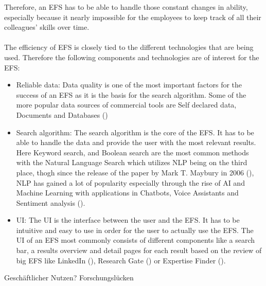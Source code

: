 Therefore, an \ac{EFS} has to be able to handle those constant changes in ability, especially because it nearly impossible for the employees to keep track of all their 
colleagues’ skills over time.
\\ \\
The efficiency of \ac{EFS} is closely tied to the different technologies that are being used. Therefore the following components and technologies are of interest for the \ac{EFS}:
\begin{itemize}
    \item Reliable data: Data quality is one of the most important factors for the success of an \ac{EFS} as it is the basis for the search algorithm. Some of the
    more popular data sources of commercial tools are Self declared data, Documents and Databases (\cite[page 18]{maybury_expert_2006})
    \item Search algorithm: The search algorithm is the core of the \ac{EFS}. It has to be able to handle the data and provide the user with the most relevant 
    results. Here Keyword search, and Boolean search are the most common methods with the Natural Language Search which utilizes \ac{NLP} being on the third place,
    thogh since the release of the paper by Mark T. Maybury in 2006 (\cite[page 18]{maybury_expert_2006}), \ac{NLP} has gained a lot of popularity especially 
    through the rise of \ac{AI} and Machine Learning with applications in Chatbots, Voice Assistants and Sentiment analysis (\cite{administrator_role_2023}).
    \item \ac{UI}: The \ac{UI} is the interface between the user and the \ac{EFS}. It has to be intuitive and easy to use in order for the user to actually use the \ac{EFS}.
    The \ac{UI} of an \ac{EFS} most commonly consists of different components like a search bar, a results overview and detail pages for each result based on the review of big 
    \ac{EFS} like LinkedIn (\cite{noauthor_linkedin_nodate}), Research Gate (\cite{noauthor_researchgate_nodate}) or Expertise Finder (\cite{noauthor_expertise_nodate-1}). 

\end{itemize}

Geschäftlicher Nutzen?
Forschungslücken


